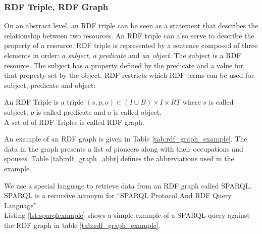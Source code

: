 \subsubsection{RDF Triple, RDF Graph}
\label{sec:rdf_triples}
On an abstract level, an RDF triple can be seen as a statement that describes the relationship between two resources. An RDF triple can also serve to describe the property of a resource. RDF triple is represented by a sentence composed of three elements in order: \textit{a subject}, \textit{a predicate} and \textit{an object}.
The subject is a RDF resource. The subject has a property defined by the predicate and a value for that property set by the object.
RDF restricts which RDF terms can be used for subject, predicate and object:

\begin{definition}
An RDF Triple is a triple $(s, p, o) \in ( I \cup B ) \times I \times RT$ where $s$ is called subject, $p$ is called predicate and $o$ is called object. \\
A set of of RDF Triples is called RDF graph.
\end{definition}

\begin{example}
	An example of an RDF graph is given in Table \ref{tab:rdf_graph_example}. 
	The data in the graph presents a list of pioneers along with their occupations and spouses. Table \ref{tab:rdf_graph_abbr} defines the abbreviations used in the example. \\
\end{example}

We use a special language to retrieve data from an RDF graph called SPARQL. SPARQL \cite{asd} is a recursive acronym for “SPARQL Protocol And RDF Query Language”. \\

Listing \ref{lst:sparqlexample} shows a simple example of a SPARQL query
against the RDF graph in table \ref{tab:rdf_graph_example}. \\

